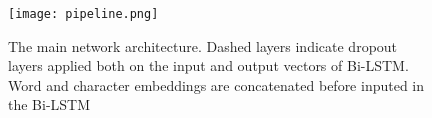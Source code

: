 \begin{figure}
  \caption{The main network architecture. Dashed layers indicate dropout layers
  applied both on the input and output vectors of Bi-LSTM. Word and character
  embeddings are concatenated before inputed in the Bi-LSTM \cite{ma2016end}}
  \label{fig:pipeline}
  \centering
    \texttt{[image: pipeline.png]}
\end{figure}

